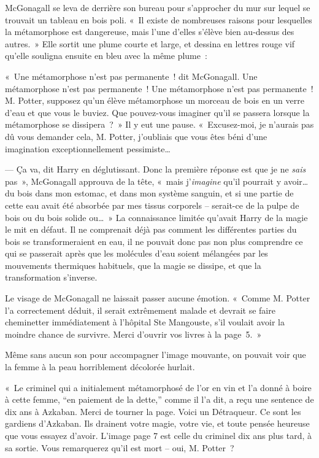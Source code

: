 McGonagall se leva de derrière son bureau pour s'approcher du mur sur lequel se trouvait un tableau en bois poli.
«~Il existe de nombreuses raisons pour lesquelles la métamorphose est dangereuse, mais l'une d'elles s'élève bien au-dessus des autres.~»
Elle sortit une plume courte et large, et dessina en lettres rouge vif qu'elle souligna ensuite en bleu avec la même plume~:


«~Une métamorphose n'est pas permanente~! dit McGonagall.
Une métamorphose n'est pas permanente~!
Une métamorphose n'est pas permanente~!
M. Potter, supposez qu'un élève métamorphose un morceau de bois en un verre d'eau et que vous le buviez.
Que pouvez-vous imaginer qu'il se passera lorsque la métamorphose se dissipera~?~»
Il y eut une pause.
«~Excusez-moi, je n'aurais pas dû vous demander cela, M. Potter, j'oubliais que vous êtes béni d'une imagination exceptionnellement pessimiste…

--- Ça va, dit Harry en déglutissant.
Donc la première réponse est que je ne \emph{sais} pas~», McGonagall approuva de la tête, «~mais j'\emph{imagine} qu'il pourrait y avoir… du bois dans mon estomac, et dans mon système sanguin, et si une partie de cette eau avait été absorbée par mes tissus corporels -- serait-ce de la pulpe de bois ou du bois solide ou…~»
La connaissance limitée qu'avait Harry de la magie le mit en défaut.
Il ne comprenait déjà pas comment les différentes parties du bois se transformeraient en eau,
il ne pouvait donc pas non plus comprendre ce qui se passerait après que les molécules d'eau soient mélangées par les mouvements thermiques habituels, que la magie se dissipe, et que la transformation s'inverse.

Le visage de McGonagall ne laissait passer aucune émotion.
«~Comme M. Potter l'a correctement déduit, il serait extrêmement malade et devrait se faire cheminetter immédiatement à l'hôpital Ste Mangouste, s'il voulait avoir la moindre chance de survivre.
Merci d'ouvrir vos livres à la page~5.~»

Même sans aucun son pour accompagner l'image mouvante, on pouvait voir que la femme à la peau horriblement décolorée hurlait.

«~Le criminel qui a initialement métamorphosé de l'or en vin et l'a donné à boire à cette femme, “en paiement de la dette,” comme il l'a dit, a reçu une sentence de dix ans à Azkaban.
Merci de tourner la page.
Voici un Détraqueur.
Ce sont les gardiens d'Azkaban.
Ils drainent votre magie, votre vie, et toute pensée heureuse que vous essayez d'avoir.
L'image page 7 est celle du criminel dix ans plus tard, à sa sortie.
Vous remarquerez qu'il est mort -- oui, M. Potter~?

